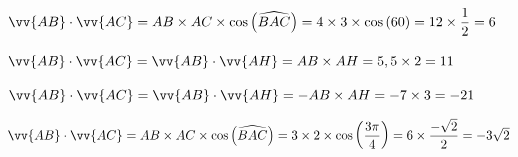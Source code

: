 \documentclass[11pt,a4paper]{article}  %
\begin{document}
\begin{corrBox}
	\begin{enumMet}
		\item $\vv{A B} \cdot \vv{A C}=AB\times AC \times \cos \left(\widehat{BAC}\right)=4\times3\times\cos\left(60\right)=12\times\dfrac{1}{2}=6$
		\item $\vv{A B} \cdot \vv{A C}=\vv{A B} \cdot \vv{A H}=AB\times AH=5,5\times2=11$
		\item $\vv{A B} \cdot \vv{A C}=\vv{A B} \cdot \vv{A H}=-AB\times AH=-7\times3=-21$
		\item $\vv{A B} \cdot \vv{A C}=AB\times AC \times \cos \left(\widehat{BAC}\right)=3\times2\times\cos\left(\dfrac{3\pi}{4}\right)=6\times\dfrac{-\sqrt{2}}{2}=-3\sqrt{2}$
	\end{enumMet}
\end{corrBox}
\end{document}
